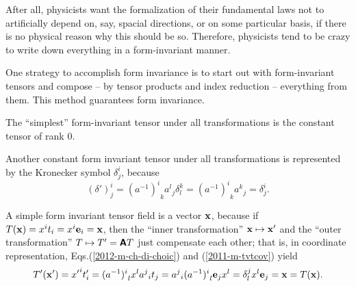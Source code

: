 After all, physicists want the formalization of their fundamental laws not to artificially depend on,
say, spacial directions, or on some particular basis, if there is no physical reason why this should be so.
Therefore, physicists tend to be crazy to write down everything in a
form-invariant manner.

One strategy to accomplish  form invariance  is to start out with form-invariant
tensors and compose -- by tensor products and index reduction -- everything from them. This method guarantees form
invariance.

{
\color{blue}
\bexample

The ``simplest'' form-invariant tensor under all transformations is the constant tensor of rank $0$.

Another constant form invariant tensor  under all transformations is represented by the Kronecker symbol $\delta^i_j$,
because
\begin{equation}
{(\delta ')}^i_j= {(a^{-1})^i}_{k} {a^{l}}_j\delta^{k}_{l}={(a^{-1})^i}_{k} {a^{k}}_j= \delta^i_j
.
\end{equation}

A simple form invariant tensor field is a vector ${\bf x}$,
because if $T({\bf x})= x^i t_i= x^i {\bf e}_i={\bf x}$, then
the ``inner transformation''
${\bf x} \mapsto  {\bf x}'$
and the ``outer transformation''
$T \mapsto  T'= \textsf{\textbf{A}}T$
just compensate each other; that is, in coordinate representation, Eqs.(\ref{2012-m-ch-di-choic}) and (\ref{2011-m-tvtcov}) yield
\begin{equation}
T'({\bf x}')= {x'}^i t'_i= {(a^{-1})^i}_l x^l   {a^j}_i t_j = {a^j}_i {(a^{-1})^i}_l  {\bf e}_j  x^l
= \delta_l^j x^l {\bf e}_j  = {\bf x} = T({\bf x}).
\end{equation}



}
